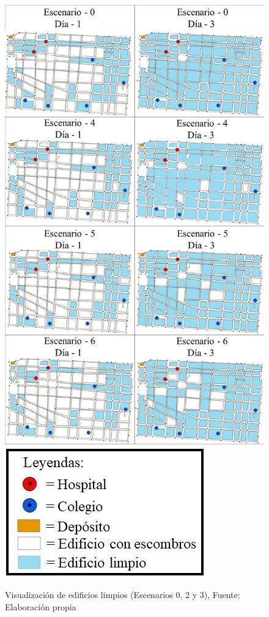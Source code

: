 \documentclass[12pt,a4paper]{article}
\begin{document}
\begin{figure}[h!]
\centering
\includegraphics[scale=0.25]{Figuras/visu4.jpg}
\includegraphics[scale=0.4]{Figuras/simb2.jpg}  
\caption{Visualización de edificios limpios  (Escenarios 0, 2 y 3), Fuente: Elaboración propia}
\label{fig:esc0456-visu}
\end{figure}
\end{document}
